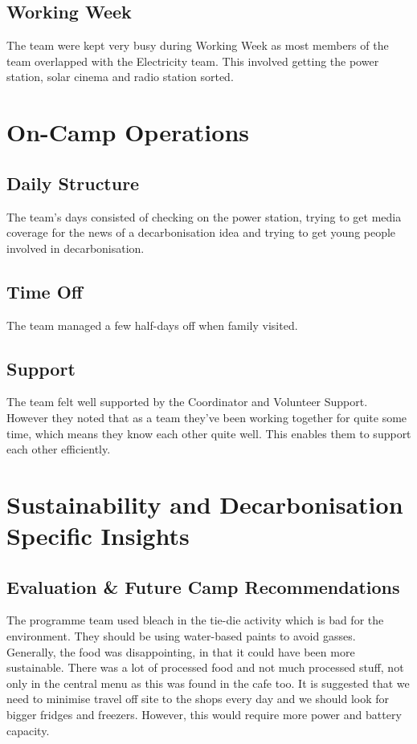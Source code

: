 \subsection{Working Week}
The team were kept very busy during Working Week as most members of the team overlapped with the Electricity team. This involved getting the power station, solar cinema and radio station sorted.

\section{On-Camp Operations}
\subsection{Daily Structure}
The team's days consisted of checking on the power station, trying to get media coverage for the news of a decarbonisation idea and trying to get young people involved in decarbonisation.
\subsection{Time Off}
The team managed a few half-days off when family visited.
\subsection{Support}
The team felt well supported by the Coordinator and Volunteer Support. However they noted that as a team they've been working together for quite some time, which means they know each other quite well. This enables them to support each other efficiently.

\section{Sustainability and Decarbonisation Specific Insights}
\subsection{Evaluation \& Future Camp Recommendations}
The programme team used bleach in the tie-die activity which is bad for the environment. They should be using water-based paints to avoid gasses.\\

Generally, the food was disappointing, in that it could have been more sustainable. There was a lot of processed food and not much processed stuff, not only in the central menu as this was found in the cafe too. It is suggested that we need to minimise travel off site to the shops every day and we should look for bigger fridges and freezers. However, this would require more power and battery capacity. \\

